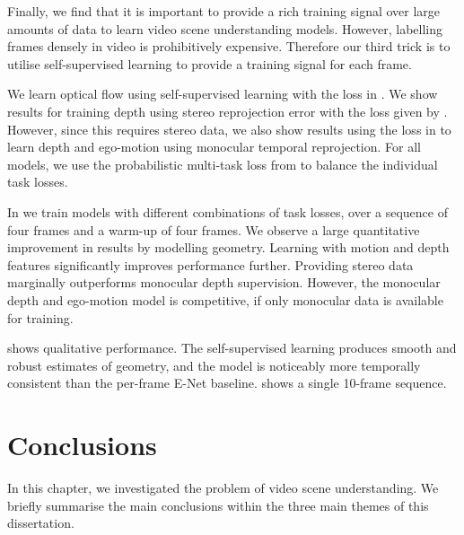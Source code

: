 Finally, we find that it is important to provide a rich training signal over large amounts of data to learn video scene understanding models. However, labelling frames densely in video is prohibitively expensive. Therefore our third trick is to utilise self-supervised learning to provide a training signal for each frame.

We learn optical flow using self-supervised learning with the loss in . We show results for training depth using stereo reprojection error with the loss given by . However, since this requires stereo data, we also show results using the loss in  to learn depth and ego-motion using monocular temporal reprojection. For all models, we use the probabilistic multi-task loss from \cite{kendall2017multi} to balance the individual task losses.

In  we train models with different combinations of task losses, over a sequence of four frames and a warm-up of four frames. We observe a large quantitative improvement in results by modelling geometry. Learning with motion and depth features significantly improves performance further. Providing stereo data marginally outperforms monocular depth supervision. However, the monocular depth and ego-motion model is competitive, if only monocular data is available for training. 

 shows qualitative performance. The self-supervised learning produces smooth and robust estimates of geometry, and the model is noticeably more temporally consistent than the per-frame E-Net baseline.  shows a single 10-frame sequence.


\section{Conclusions}

In this chapter, we investigated the problem of video scene understanding. We briefly summarise the main conclusions within the three main themes of this dissertation.

